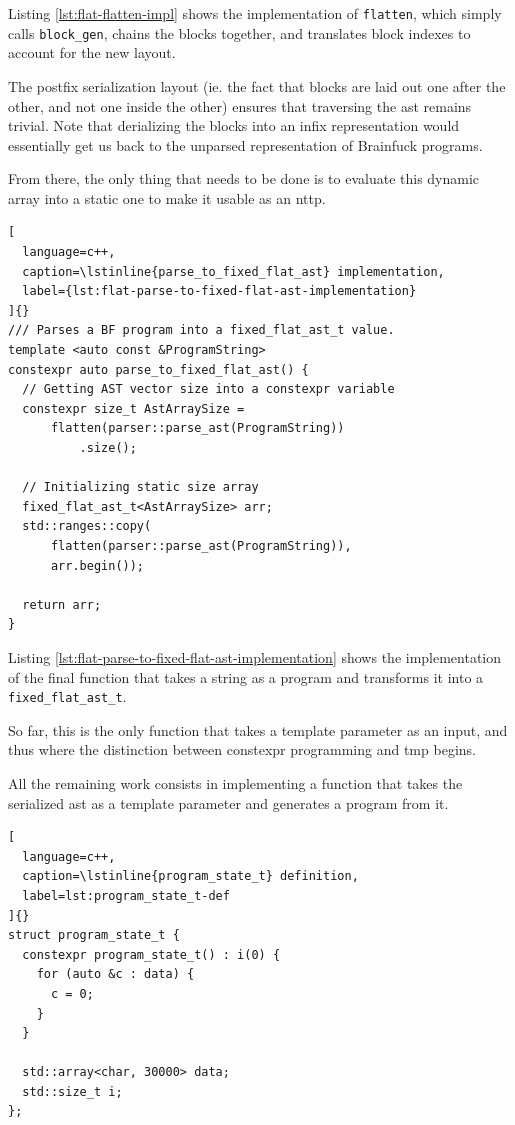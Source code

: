 \documentclass[../main]{subfiles}
\begin{document}
Listing \ref{lst:flat-flatten-impl} shows the implementation of
\lstinline{flatten}, which simply calls \lstinline{block_gen},
chains the blocks together, and translates block indexes to account for
the new layout.

The postfix serialization layout (ie. the fact that blocks are laid out
one after the other, and not one inside the other) ensures that
traversing the \gls{ast} remains trivial. Note that derializing the blocks
into an infix representation would essentially get us back to the
unparsed representation of Brainfuck programs.

From there, the only thing that needs to be done is to evaluate this
dynamic array into a static one to make it usable as an \gls{nttp}.

\begin{lstlisting}[
  language=c++,
  caption=\lstinline{parse_to_fixed_flat_ast} implementation,
  label={lst:flat-parse-to-fixed-flat-ast-implementation}
]{}
/// Parses a BF program into a fixed_flat_ast_t value.
template <auto const &ProgramString>
constexpr auto parse_to_fixed_flat_ast() {
  // Getting AST vector size into a constexpr variable
  constexpr size_t AstArraySize =
      flatten(parser::parse_ast(ProgramString))
          .size();

  // Initializing static size array
  fixed_flat_ast_t<AstArraySize> arr;
  std::ranges::copy(
      flatten(parser::parse_ast(ProgramString)),
      arr.begin());

  return arr;
}
\end{lstlisting}

Listing \ref{lst:flat-parse-to-fixed-flat-ast-implementation} shows the
implementation of the final function that takes a string as a program
and transforms it into a \lstinline{fixed_flat_ast_t}.

So far, this is the only function that takes a template parameter as an input,
and thus where the distinction between \gls{constexpr} programming and \gls{tmp}
begins.

All the remaining work consists in implementing a function that takes the
serialized \gls{ast} as a template parameter and generates a program from it.

\begin{lstlisting}[
  language=c++,
  caption=\lstinline{program_state_t} definition,
  label=lst:program_state_t-def
]{}
struct program_state_t {
  constexpr program_state_t() : i(0) {
    for (auto &c : data) {
      c = 0;
    }
  }

  std::array<char, 30000> data;
  std::size_t i;
};
\end{lstlisting}
\end{document}
